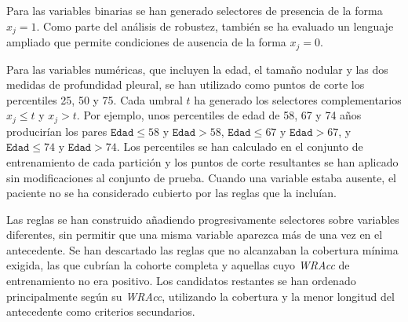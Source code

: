 Para las variables binarias se han generado selectores de presencia de la forma \(x_j=1\). Como parte del análisis de robustez, también se ha evaluado un lenguaje ampliado que permite condiciones de ausencia de la forma \(x_j=0\). 


Para las variables numéricas, que incluyen la edad, el tamaño nodular y las dos medidas de profundidad pleural, se han utilizado como puntos de corte los percentiles 25, 50 y 75. Cada umbral \(t\) ha generado los selectores complementarios \(x_j \leq t\) y \(x_j > t\). Por ejemplo, unos percentiles de edad de 58, 67 y 74 años producirían los pares \(\texttt{Edad} \leq 58\) y \(\texttt{Edad} > 58\), \(\texttt{Edad} \leq 67\) y \(\texttt{Edad} > 67\), y \(\texttt{Edad} \leq 74\) y \(\texttt{Edad} > 74\). Los percentiles se han calculado en el conjunto de entrenamiento de cada partición y los puntos de corte resultantes se han aplicado sin modificaciones al conjunto de prueba. Cuando una variable estaba ausente, el paciente no se ha considerado cubierto por las reglas que la incluían.


Las reglas se han construido añadiendo progresivamente selectores sobre variables diferentes, sin permitir que una misma variable aparezca más de una vez en el antecedente. Se han descartado las reglas que no alcanzaban la cobertura mínima exigida, las que cubrían la cohorte completa y aquellas cuyo \textit{WRAcc} de entrenamiento no era positivo. Los candidatos restantes se han ordenado principalmente según su \textit{WRAcc}, utilizando la cobertura y la menor longitud del antecedente como criterios secundarios.

